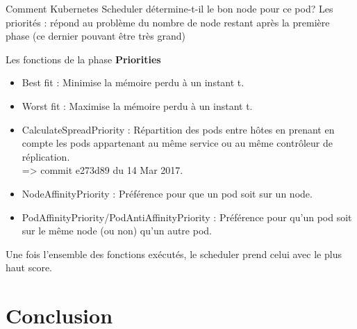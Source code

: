 \documentclass{bredelebeamer}
\begin{document}
\begin{frame}{Comment Kubernetes Scheduler détermine-t-il le bon node pour ce pod?}
Les priorités : répond au problème du nombre de node restant après la première phase (ce dernier pouvant être très grand)
\begin{block}{Les fonctions de la phase \textbf{Priorities}}
\begin{itemize}
\item Best fit : Minimise la mémoire perdu à un instant t.\pause
\item Worst fit : Maximise la mémoire perdu à un instant t.\pause
\item CalculateSpreadPriority : Répartition des pods entre hôtes en prenant en compte les pods appartenant au même service ou au même contrôleur de réplication. \\
=> commit e273d89 du 14 Mar 2017.\pause
\item NodeAffinityPriority : Préférence pour que un pod soit sur un node.\pause
\item PodAffinityPriority/PodAntiAffinityPriority : Préférence pour qu'un pod soit sur le même node (ou non) qu'un autre pod.
\end{itemize}
\end{block}
Une fois l'ensemble des fonctions exécutés, le scheduler prend celui avec le plus haut score.
\end{frame}

\section{Conclusion}
\end{document}
